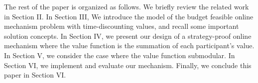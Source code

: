 \documentclass[conference,compsocconf,letterpaper,10pt]{IEEEtran}
\newcommand{\ie}{{\em i.e.}}
\begin{document}
The rest of the paper is organized as follows. We briefly review the related work in Section II. In Section III, We introduce the model of the budget feasible online mechanism problem with time-discounting values, and recall some important solution concepts. In Section IV, we present our design of a strategy-proof online  mechanism where the value function is the summation of each participant's value. In Section V, we consider the case where the value function submodular. In Section VI, we implement and evaluate our mechanism. Finally, we conclude this paper in Section VI.
\end{document}
